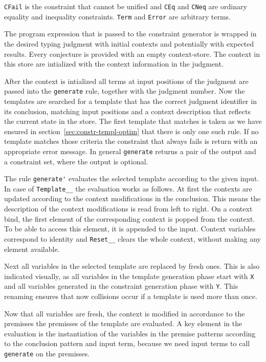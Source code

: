 \verb|CFail| is the constraint that cannot be unified and \verb|CEq|
and \verb|CNeq| are ordinary equality and inequality
constraints. \verb|Term| and \verb|Error| are arbitrary terms.

The program expression that is passed to the constraint generator is
wrapped in the desired typing judgment with initial contexts and
potentially with expected results. Every conjecture is provided with
an empty context-store. The context in this store are intialized with
the context information in the judgment.

After the context is intialized all terms at input positions of the
judgment are passed into the \verb|generate| rule, together with the
judgment number. Now the templates are searched for a template that has the
correct judgment identifier in its conclusion, matching input
positions and a context description that reflects the current state in
the store. The first template that matches is taken as we have ensured
in section~\ref{sec:constr-templ-optim} that there is only one such
rule. If no template matches those criteria the constraint that always
fails is return with an appropriate error message. In general
\verb|generate| returns a pair of the output and a constraint set,
where the output is optional. 

The rule \verb|generate'| evaluates the selected template according to
the given input. In case of \verb|Template__| the evaluation works as
follows. At first the contexts are updated according to the context
modifications in the conclusion. This means the description of the
context modifications is read from left to right. On a context bind,
the first element of the corresponding context is popped from the
context. To be able to access this element, it is appended to the
input. Context variables correspond to identity and \verb|Reset__|
clears the whole context, without making any element available.

Next all variables in the selected template are replaced by fresh
ones. This is also indicated visually, as all variables in the
template generation phase start with \verb|X| and all variables
generated in the constraint generation phase with \verb|Y|. This
renaming ensures that now collisions occur if a template is used more
than once.

Now that all variables are fresh, the context is modified in
accordance to the premisses the premisses of the template are
evaluated. A key element in the evaluation is the instantiation of the
variables in the premise patterns according to the conclusion pattern
and input term, because we need input terms to call \verb|generate| on
the premisses.

